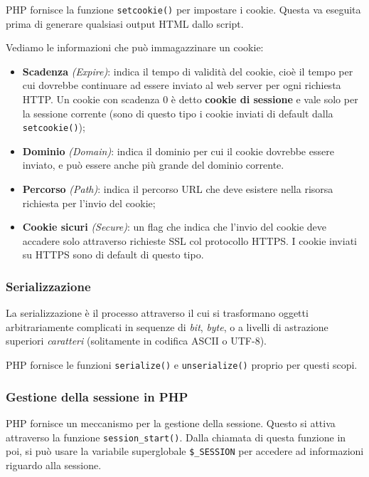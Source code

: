 \documentclass[a4paper,11pt]{article}
\begin{document}
PHP fornisce la funzione \lstinline|setcookie()| per impostare i cookie.
Questa va eseguita prima di generare qualsiasi output HTML dallo script.

Vediamo le informazioni che può immagazzinare un cookie:
\begin{itemize}
	\item \textbf{Scadenza} \textit{(Expire)}: indica il tempo di validità del cookie, cioè il tempo per cui dovrebbe continuare ad essere inviato al web server per ogni richiesta HTTP.
		Un cookie con scadenza 0 è detto \textbf{cookie di sessione} e vale solo per la sessione corrente (sono di questo tipo i cookie inviati di default dalla \lstinline|setcookie()|);
	\item \textbf{Dominio} \textit{(Domain)}: indica il dominio per cui il cookie dovrebbe essere inviato, e può essere anche più grande del dominio corrente.
	\item \textbf{Percorso} \textit{(Path)}: indica il percorso URL che deve esistere nella risorsa richiesta per l'invio del cookie;
	\item \textbf{Cookie sicuri} \textit{(Secure)}: un flag che indica che l'invio del cookie deve accadere solo attraverso richieste SSL col protocollo HTTPS. I cookie inviati su HTTPS sono di default di questo tipo.

\end{itemize}

\subsubsection{Serializzazione}
La serializzazione è il processo attraverso il cui si trasformano oggetti arbitrariamente complicati in sequenze di \textit{bit}, \textit{byte}, o a livelli di astrazione superiori \textit{caratteri} (solitamente in codifica ASCII o UTF-8).

PHP fornisce le funzioni \lstinline|serialize()| e \lstinline|unserialize()| proprio per questi scopi.

\subsubsection{Gestione della sessione in PHP}
PHP fornisce un meccanismo per la gestione della sessione.
Questo si attiva attraverso la funzione \lstinline|session_start()|.
Dalla chiamata di questa funzione in poi, si può usare la variabile superglobale \lstinline|$_SESSION| per accedere ad informazioni riguardo alla sessione.
\end{document}
